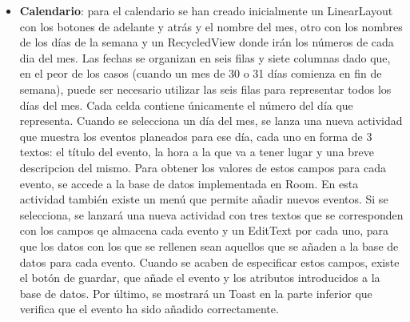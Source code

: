 \documentclass[a4paper,openright,12pt]{article}
\begin{document}
\begin{itemize}
    \item \textbf{Calendario}:
    para el calendario se han creado inicialmente un LinearLayout con los botones de adelante y atrás y el nombre del mes, otro con los nombres de los días de la semana y un RecycledView donde irán los números de cada dia del mes. Las fechas se organizan en seis filas y siete columnas dado que, en el peor de los casos (cuando un mes de 30 o 31 días comienza en fin de semana), puede ser necesario utilizar las seis filas para representar todos los días del mes. Cada celda contiene únicamente el número del día que representa.  Cuando se selecciona un día del mes, se lanza una nueva actividad que muestra los eventos planeados para ese día, cada uno en forma de 3 textos: el título del evento, la hora a la que va a tener lugar y una breve descripcion del mismo. Para obtener los valores de estos campos para cada evento, se accede a la base de datos implementada en Room. En esta actividad también existe un menú que permite añadir nuevos eventos. Si se selecciona, se lanzará una nueva actividad con tres textos que se corresponden con los campos qe almacena cada evento y un EditText por cada uno, para que los datos con los que se rellenen sean aquellos que se añaden a la base de datos para cada evento. Cuando se acaben de especificar estos campos, existe el botón de guardar, que añade el evento y los atributos introducidos a la base de datos. Por último, se mostrará un Toast en la parte inferior que verifica que el evento ha sido añadido correctamente.
\end{itemize}







\end{document}
